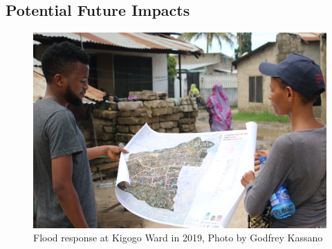 \documentclass[a4paper,12pt,twoside]{article}
\begin{document}
\subsection{Potential Future Impacts}
\begin{figure}[h]
    \centering
    \includegraphics[width=.75\textwidth]{images/Wichomap.JPG}
    \caption{Flood response at Kigogo Ward in 2019, Photo by Godfrey Kassano}
\end{figure}
\end{document}
